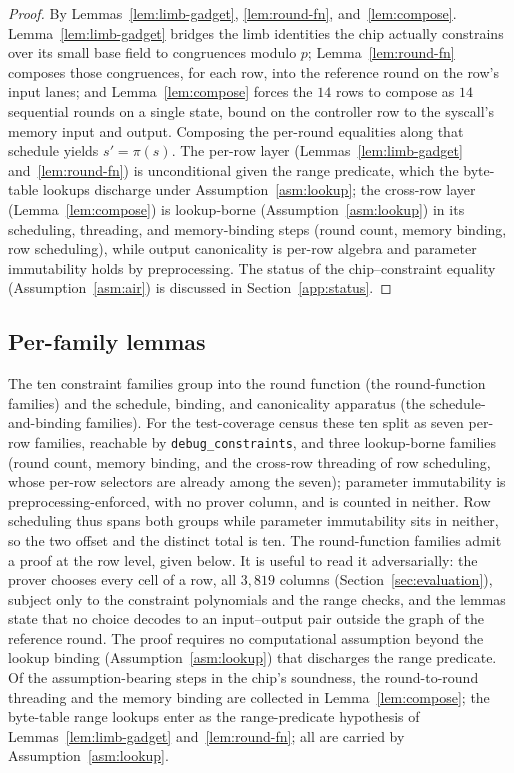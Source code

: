 \begin{proof}
By Lemmas~\ref{lem:limb-gadget}, \ref{lem:round-fn}, and~\ref{lem:compose}. Lemma~\ref{lem:limb-gadget} bridges the limb identities the chip actually constrains over its small base field to congruences modulo $p$; Lemma~\ref{lem:round-fn} composes those congruences, for each row, into the reference round on the row's input lanes; and Lemma~\ref{lem:compose} forces the $14$ rows to compose as $14$ sequential rounds on a single state, bound on the controller row to the syscall's memory input and output. Composing the per-round equalities along that schedule yields $s'=\pi(s)$. The per-row layer (Lemmas~\ref{lem:limb-gadget} and~\ref{lem:round-fn}) is unconditional given the range predicate, which the byte-table lookups discharge under Assumption~\ref{asm:lookup}; the cross-row layer (Lemma~\ref{lem:compose}) is lookup-borne (Assumption~\ref{asm:lookup}) in its scheduling, threading, and memory-binding steps (round count, memory binding, row scheduling), while output canonicality is per-row algebra and parameter immutability holds by preprocessing. The status of the chip--constraint equality (Assumption~\ref{asm:air}) is discussed in Section~\ref{app:status}.
\end{proof}

\subsection{Per-family lemmas}\label{app:air-families}
The ten constraint families group into the round function (the round-function families) and the schedule, binding, and canonicality apparatus (the schedule-and-binding families). For the test-coverage census these ten split as seven per-row families, reachable by \texttt{debug\_constraints}, and three lookup-borne families (round count, memory binding, and the cross-row threading of row scheduling, whose per-row selectors are already among the seven); parameter immutability is preprocessing-enforced, with no prover column, and is counted in neither. Row scheduling thus spans both groups while parameter immutability sits in neither, so the two offset and the distinct total is ten. The round-function families admit a proof at the row level, given below. It is useful to read it adversarially: the prover chooses every cell of a row, all $3{,}819$ columns (Section~\ref{sec:evaluation}), subject only to the constraint polynomials and the range checks, and the lemmas state that no choice decodes to an input--output pair outside the graph of the reference round. The proof requires no computational assumption beyond the lookup binding (Assumption~\ref{asm:lookup}) that discharges the range predicate. Of the assumption-bearing steps in the chip's soundness, the round-to-round threading and the memory binding are collected in Lemma~\ref{lem:compose}; the byte-table range lookups enter as the range-predicate hypothesis of Lemmas~\ref{lem:limb-gadget} and~\ref{lem:round-fn}; all are carried by Assumption~\ref{asm:lookup}.

